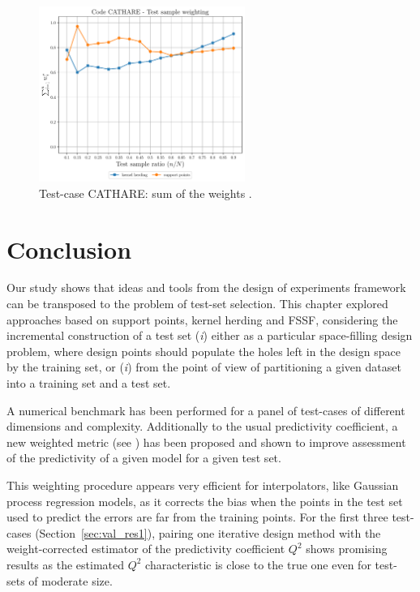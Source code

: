 \begin{figure}
  \centering
  \includegraphics[width=0.6\textwidth]{./part2/figures/SIS/cathareC2_weights.pdf}
  \caption{Test-case CATHARE: sum of the weights .}
  \label{fig:catharec2_weights}
\end{figure}




\section{Conclusion}\label{sec:val_conclusion}

Our study shows that ideas and tools from the design of experiments framework can be transposed to the problem of test-set selection. 
This chapter explored approaches based on support points, kernel herding and FSSF, considering the incremental construction of a test set (\textit{i}) either as a particular space-filling design problem, where design points should populate the holes left in the design space by the training set, or (\textit{i}) from the point of view of partitioning a given dataset into a training set and a test set. 

A numerical benchmark has been performed for a panel of test-cases of different dimensions and complexity. 
Additionally to the usual predictivity coefficient, a new weighted metric (see \citealp{PR2021a}) has been proposed and shown to improve assessment of the predictivity of a given model for a given test set. 

This weighting procedure appears very efficient for interpolators, like Gaussian process regression models, as it corrects the bias when the points in the test set used to predict the errors are far from the training points. 
For the first three test-cases (Section~\ref{sec:val_res1}), pairing one iterative design method with the weight-corrected estimator of the predictivity coefficient $Q^2$ shows promising results as the estimated $Q^2$ characteristic is close to the true one even for test-sets of moderate size. 

